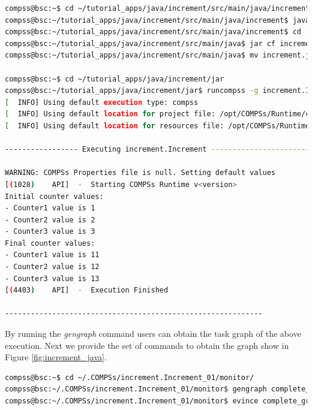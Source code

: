 \begin{lstlisting}[language=bash]
compss@bsc:~$ cd ~/tutorial_apps/java/increment/src/main/java/increment/
compss@bsc:~/tutorial_apps/java/increment/src/main/java/increment$ javac *.java
compss@bsc:~/tutorial_apps/java/increment/src/main/java/increment$ cd ..
compss@bsc:~/tutorial_apps/java/increment/src/main/java$ jar cf increment.jar increment
compss@bsc:~/tutorial_apps/java/increment/src/main/java$ mv increment.jar ~/tutorial_apps/java/increment/jar/

compss@bsc:~$ cd ~/tutorial_apps/java/increment/jar
compss@bsc:~/tutorial_apps/java/increment/jar$ runcompss -g increment.Increment 10 1 2 3
[  INFO] Using default execution type: compss
[  INFO] Using default location for project file: /opt/COMPSs/Runtime/configuration/xml/projects/default_project.xml
[  INFO] Using default location for resources file: /opt/COMPSs/Runtime/configuration/xml/resources/default_resources.xml

----------------- Executing increment.Increment --------------------------

WARNING: COMPSs Properties file is null. Setting default values
[(1028)    API]  -  Starting COMPSs Runtime v<version>
Initial counter values:
- Counter1 value is 1
- Counter2 value is 2
- Counter3 value is 3
Final counter values:
- Counter1 value is 11
- Counter2 value is 12
- Counter3 value is 13
[(4403)    API]  -  Execution Finished

------------------------------------------------------------
\end{lstlisting}

By running the \textit{gengraph} command users can obtain the task graph of the above execution. Next we provide the set of commands to obtain the
graph show in Figure \ref{fig:increment_java}.

\begin{lstlisting}[language=bash]
compss@bsc:~$ cd ~/.COMPSs/increment.Increment_01/monitor/
compss@bsc:~/.COMPSs/increment.Increment_01/monitor$ gengraph complete_graph.dot
compss@bsc:~/.COMPSs/increment.Increment_01/monitor$ evince complete_graph.pdf
\end{lstlisting}

